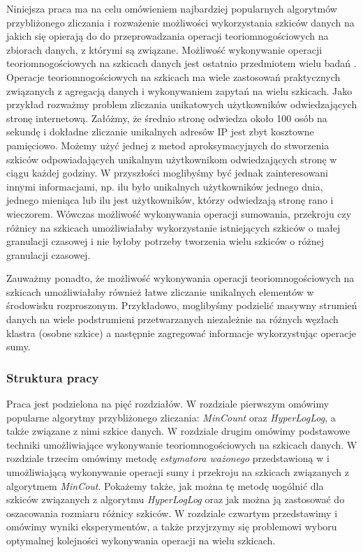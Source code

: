 Niniejsza praca ma na celu omówieniem najbardziej popularnych algorytmów przybliżonego zliczania i rozważenie możliwości wykorzystania szkiców danych
na jakich się opierają do do przeprowadzania operacji teoriomnogościowych na zbiorach danych, z którymi są związane.  Możliwość wykonywanie operacji teoriomnogościowych na szkicach danych jest ostatnio przedmiotem wielu badań \cite{ting} \cite{oertl} \cite{adroll}.
Operacje teoriomnogościowych na szkicach ma wiele zastosowań praktycznych związanych z agregacją danych i  wykonywaniem  zapytań na wielu szkicach. Jako przykład rozważmy problem zliczania unikatowych użytkowników odwiedzających stronę internetową. Załóżmy, że średnio stronę odwiedza około 100 osób na sekundę i dokładne zliczanie unikalnych adresów IP jest zbyt kosztowne pamięciowo. Możemy użyć jednej z metod aproksymacyjnych do stworzenia szkiców odpowiadających unikalnym użytkownikom odwiedzających stronę  w ciągu każdej godziny. W przyszłości moglibyśmy być jednak zainteresowani innymi informacjami, np. ilu było
unikalnych użytkowników jednego dnia, jednego mieniąca
lub ilu jest użytkowników, którzy odwiedzają stronę rano i wieczorem.   
Wówczas możliwość wykonywania operacji sumowania, przekroju czy różnicy na szkicach umożliwiałaby wykorzystanie istniejących szkiców o małej granulacji czasowej i nie byłoby potrzeby tworzenia wielu szkiców o różnej granulacji czasowej. 

Zauważmy ponadto, że możliwość wykonywania operacji 
teoriomnogościowych na szkicach umożliwiałaby również
łatwe zliczanie unikalnych elementów w środowisku rozproszonym. Przykładowo, moglibyśmy podzielić masywny strumień danych na wiele podstrumieni przetwarzanych niezależnie na różnych węzłach klastra (osobne szkice)
a następnie zagregować informacje wykorzystując operacje sumy.

\subsubsection{Struktura pracy}
Praca jest podzielona na pięć rozdziałów. W rozdziale pierwszym omówimy popularne algorytmy przybliżonego zliczania: \textit{MinCount} oraz \textit{HyperLogLog}, a także związane z nimi szkice danych. 
W rozdziale drugim omówimy podstawowe techniki 
umożliwiające wykonywanie  teoriomnogościowych na szkicach danych. W rozdziale trzecim omówimy metodę \textit{estymatora ważonego} przedstawioną w \cite{ting} i umożliwiającą wykonywanie operacji sumy i przekroju na szkicach związanych z algorytmem \textit{MinCout}. Pokażemy także, jak można tę metodę uogólnić dla szkiców związanych z algorytmu \textit{HyperLogLog} oraz jak można ją zastosować do oszacowania rozmiaru różnicy szkiców. W rozdziale czwartym przedstawimy i omówimy wyniki eksperymentów, a także przyjrzymy się problemowi wyboru optymalnej kolejności wykonywania operacji na wielu szkicach. 